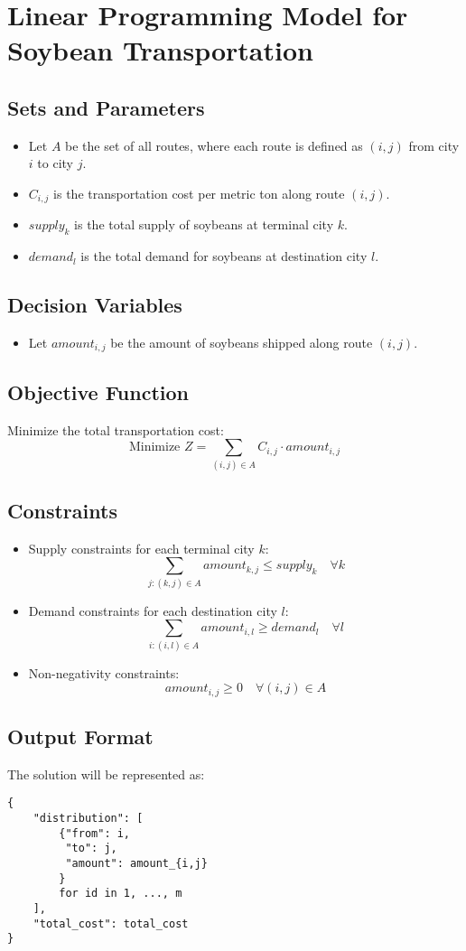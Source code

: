 \documentclass{article}
\begin{document}
\section*{Linear Programming Model for Soybean Transportation}

\subsection*{Sets and Parameters}
\begin{itemize}
    \item Let \( A \) be the set of all routes, where each route is defined as \( (i, j) \) from city \( i \) to city \( j \).
    \item \( C_{i,j} \) is the transportation cost per metric ton along route \( (i, j) \).
    \item \( supply_k \) is the total supply of soybeans at terminal city \( k \).
    \item \( demand_l \) is the total demand for soybeans at destination city \( l \).
\end{itemize}

\subsection*{Decision Variables}
\begin{itemize}
    \item Let \( amount_{i,j} \) be the amount of soybeans shipped along route \( (i,j) \).
\end{itemize}

\subsection*{Objective Function}
Minimize the total transportation cost:
\[
\text{Minimize } Z = \sum_{(i,j) \in A} C_{i,j} \cdot amount_{i,j}
\]

\subsection*{Constraints}
\begin{itemize}
    \item Supply constraints for each terminal city \( k \):
    \[
    \sum_{j : (k,j) \in A} amount_{k,j} \leq supply_k \quad \forall k
    \]
    
    \item Demand constraints for each destination city \( l \):
    \[
    \sum_{i : (i,l) \in A} amount_{i,l} \geq demand_l \quad \forall l
    \]

    \item Non-negativity constraints:
    \[
    amount_{i,j} \geq 0 \quad \forall (i,j) \in A
    \]
\end{itemize}

\subsection*{Output Format}
The solution will be represented as:
\begin{verbatim}
{
    "distribution": [
        {"from": i,
         "to": j,
         "amount": amount_{i,j}
        }
        for id in 1, ..., m
    ],
    "total_cost": total_cost
}
\end{verbatim}
\end{document}
